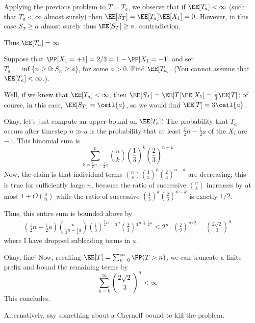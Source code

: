\documentclass[11pt, headheight=30pt]{scrartcl}
\begin{document}
Applying the previous problem to $T = T_a$, we observe that if $\EE[T_a] < \infty$
(such that $T_a < \infty$ almost surely) then $\EE[S_T] = \EE[T_a]\EE[X_1] = 0$.
However, in this case $S_T \geq a$ almost surely thus $\EE[S_T]\geq a$, contradiction.

Thus $\EE[T_a] = \infty$.

\begin{prob}
    Suppose that $\PP[X_1 = +1] = 2/3 = 1 - \PP[X_1 = -1]$ and set $T_a = \inf\{n \geq 0 : S_n \geq a\}$, for some
    $a > 0$. Find $\EE[T_a]$. (You cannot assume that $\EE[T_a] < \infty$.).
\end{prob}

Well, if we knew that $\EE[T_a] < \infty$,
then $\EE[S_T] = \EE[T]\EE[X_1] = \frac13 \EE[T]$; of course,
in this case, $\EE[S_T] = \ceil{a}$,
so we would find $\EE[T] = 3\ceil{a}$.

Okay, let's just compute an upper bound on $\EE[T_a]$!
The probability that $T_a$ occurs after timestep $n\gg a$ is the probability
that at least $\frac12 n - \frac12 a$ of the $X_i$ are $-1$. This binomial sum is
\[
    \sum_{k = \frac12 n -\frac12 a}^n \binom{n}{k}
    \left(\frac13\right)^k \left(\frac23\right)^{n-k} 
\]
Now, the claim is that individual terms $\binom{n}{k}
\left(\frac13\right)^k \left(\frac23\right)^{n-k}$ are decreasing; this is true
for sufficiently large $n$, because the ratio of successive $\binom{n}{k}$ increases
by at most $1 + O(\frac{a}{n})$ while the ratio of successive $\left(\frac13\right)^k \left(\frac23\right)^{n-k}$
is exactly $1/2$.

Thus, this entire sum is bounded above by
\begin{align*}
    \left(\frac12 n + \frac12 a\right) \binom{n}{\frac12 n - \frac12 a} \left(\frac13\right)^{\frac12 n - \frac12 a} \left(\frac23\right)^{\frac12 n + \frac12 a}
    \leq 2^n \cdot \left(\frac29\right)^{n/2}  = \left(\frac{2\sqrt{2}}{3}\right)^n 
\end{align*}
where I have dropped subleading terms in $a$.

Okay, fine! Now, recalling $\EE[T] = \sum_{n = 0}^\infty \PP(T > n)$, we can truncate
a finite prefix and bound the remaining terms by
\[
    \sum_{n = k}^\infty \left(\frac{2\sqrt{2}}{3}\right)^n < \infty
\]
This concludes.

Alternatively, say something about a Chernoff bound to kill the problem.


\end{document}
